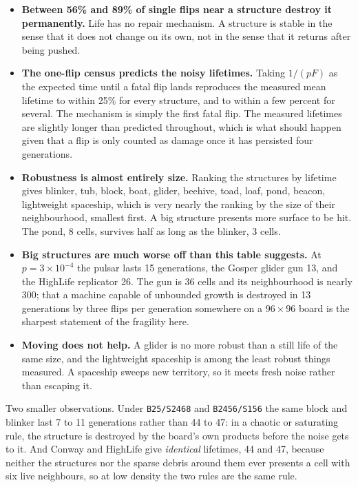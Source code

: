 \documentclass[11pt]{article}
\newcommand{\rulename}[1]{\texttt{#1}}
\begin{document}
\begin{itemize}
  \item \textbf{Between 56\% and 89\% of single flips near a structure destroy it permanently.} Life
    has no repair mechanism. A structure is stable in the sense that it does not change on its own,
    not in the sense that it returns after being pushed.
  \item \textbf{The one-flip census predicts the noisy lifetimes.} Taking $1/(pF)$ as the expected
    time until a fatal flip lands reproduces the measured mean lifetime to within 25\% for every
    structure, and to within a few percent for several. The mechanism is simply the first fatal flip.
    The measured lifetimes are slightly longer than predicted throughout, which is what should happen
    given that a flip is only counted as damage once it has persisted four generations.
  \item \textbf{Robustness is almost entirely size.} Ranking the structures by lifetime gives
    blinker, tub, block, boat, glider, beehive, toad, loaf, pond, beacon, lightweight spaceship,
    which is very nearly the ranking by the size of their neighbourhood, smallest first. A big
    structure presents more surface to be hit. The pond, 8 cells, survives half as long as the
    blinker, 3 cells.
  \item \textbf{Big structures are much worse off than this table suggests.} At
    $p=3\times10^{-4}$ the pulsar lasts 15 generations, the Gosper glider gun 13, and the HighLife
    replicator 26. The gun is 36 cells and its neighbourhood is nearly 300; that a machine capable
    of unbounded growth is destroyed in 13 generations by three flips per generation somewhere on a
    $96\times96$ board is the sharpest statement of the fragility here.
  \item \textbf{Moving does not help.} A glider is no more robust than a still life of the same size,
    and the lightweight spaceship is among the least robust things measured. A spaceship sweeps new
    territory, so it meets fresh noise rather than escaping it.
\end{itemize}

Two smaller observations. Under \rulename{B25/S2468} and \rulename{B2456/S156} the same block and
blinker last 7 to 11 generations rather than 44 to 47: in a chaotic or saturating rule, the structure
is destroyed by the board's own products before the noise gets to it. And Conway and HighLife give
\emph{identical} lifetimes, 44 and 47, because neither the structures nor the sparse debris around
them ever presents a cell with six live neighbours, so at low density the two rules are the same rule.
\end{document}
